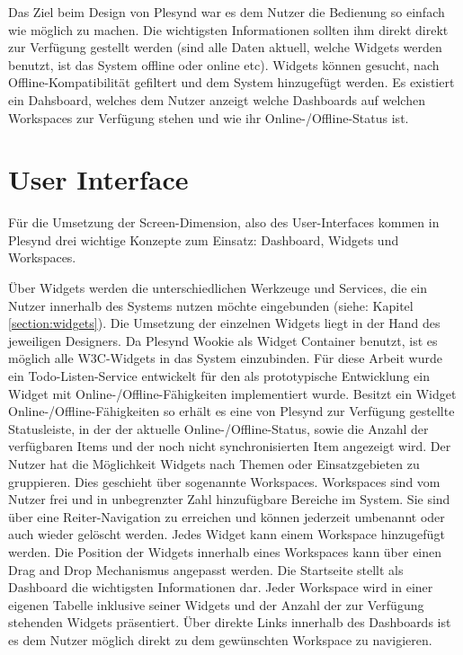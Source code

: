 Das Ziel beim Design von Plesynd war es dem Nutzer die Bedienung so einfach wie möglich zu machen. Die wichtigsten Informationen sollten ihm direkt direkt zur Verfügung gestellt werden (sind alle Daten aktuell, welche Widgets werden benutzt, ist das System offline oder online etc). Widgets können gesucht, nach Offline-Kompatibilität gefiltert und dem System hinzugefügt werden. Es existiert ein Dahsboard, welches dem Nutzer anzeigt welche Dashboards auf welchen Workspaces zur Verfügung stehen und wie ihr Online-/Offline-Status ist. 

\section{User Interface}\label{section:user_interface}
Für die Umsetzung der Screen-Dimension, also des User-Interfaces kommen in Plesynd drei wichtige Konzepte zum Einsatz: Dashboard, Widgets und Workspaces. 

Über Widgets werden die unterschiedlichen Werkzeuge und Services, die ein Nutzer innerhalb des Systems nutzen möchte eingebunden (siehe: Kapitel \ref{section:widgets}). Die Umsetzung der einzelnen Widgets liegt in der Hand des jeweiligen Designers. Da Plesynd Wookie als Widget Container benutzt, ist es möglich alle W3C-Widgets in das System einzubinden. Für diese Arbeit wurde ein Todo-Listen-Service entwickelt für den als prototypische Entwicklung ein Widget mit Online-/Offline-Fähigkeiten implementiert wurde. Besitzt ein Widget Online-/Offline-Fähigkeiten so erhält es eine von Plesynd zur Verfügung gestellte Statusleiste, in der der aktuelle Online-/Offline-Status, sowie die Anzahl der verfügbaren Items und der noch nicht synchronisierten Item angezeigt wird. Der Nutzer hat die Möglichkeit Widgets nach Themen oder Einsatzgebieten zu gruppieren. Dies geschieht über sogenannte Workspaces. Workspaces sind vom Nutzer frei und in unbegrenzter Zahl hinzufügbare Bereiche im System. Sie sind über eine Reiter-Navigation zu erreichen und können jederzeit umbenannt oder auch wieder gelöscht werden. Jedes Widget kann einem Workspace hinzugefügt werden. Die Position der Widgets innerhalb eines Workspaces kann über einen Drag and Drop Mechanismus angepasst werden. Die Startseite stellt als Dashboard die wichtigsten Informationen dar. Jeder Workspace wird in einer eigenen Tabelle inklusive seiner Widgets und der Anzahl der zur Verfügung stehenden Widgets präsentiert. Über direkte Links innerhalb des Dashboards ist es dem Nutzer möglich direkt zu dem gewünschten Workspace zu navigieren.

